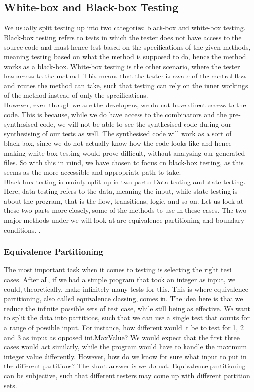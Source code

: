 \subsection{White-box and Black-box Testing}
We usually split testing up into two categories: black-box and white-box testing. Black-box testing refers to tests in which the tester does not have access to the source code and must hence test based on the specifications of the given methods, meaning testing based on what the method is supposed to do, hence the method works as a black-box. White-box testing is the other scenario, where the tester has access to the method. This means that the tester is aware of the control flow and routes the method can take, such that testing can rely on the inner workings of the method instead of only the specifications\cite{TestingCodeComplete}. \\
However, even though we are the developers, we do not have direct access to the code. This is because, while we do have access to the combinators and the pre-synthesised code, we will not be able to see the synthesised code during our synthesising of our tests as well. The synthesised code will work as a sort of black-box, since we do not actually know how the code looks like and hence making white-box testing would prove difficult, without analysing our generated files. So with this in mind, we have chosen to focus on black-box testing, as this seems as the more accessible and appropriate path to take. \\
Black-box testing is mainly split up in two parts: Data testing and state testing. Here, data testing refers to the data, meaning the input, while state testing is about the program, that is the flow, transitions, logic, and so on\cite{TestingBlackbox}. Let us look at these two parts more closely, some of the methods to use in these cases. The two major methods under we will look at are equivalence partitioning and boundary conditions. .
\subsubsection{Equivalence Partitioning}
The most important task when it comes to testing is selecting the right test cases\cite{TestingBlackbox}. After all, if we had a simple program that took an integer as input, we could, theoretically, make infinitely many tests for this. This is where equivalence partitioning, also called equivalence classing, comes in. The idea here is that we reduce the infinite possible sets of test case, while still being as effective. We want to split the data into partitions, such that we can use a single test that counts for a range of possible input. For instance, how different would it be to test for 1, 2 and 3 as input as opposed int.MaxValue? We would expect that the first three cases would act similarly, while the program would have to handle the maximum integer value differently. However, how do we know for sure what input to put in the different partitions? The short answer is we do not. Equivalence partitioning can be subjective, such that different testers may come up with different partition sets\cite{TestingBlackbox}.
